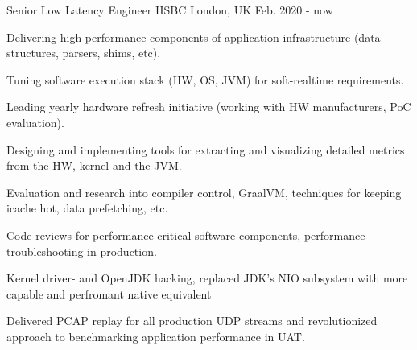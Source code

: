 

\begin{cventries}

  \cventry
    {Senior Low Latency Engineer} %
    {HSBC} %
    {London, UK} %
    {Feb. 2020 - now} %
    {
      \begin{cvitems} %
        \item {Delivering high-performance components of application infrastructure (data structures, parsers, shims, etc).}
        \item {Tuning software execution stack (HW, OS, JVM) for soft-realtime requirements.}
        \item {Leading yearly hardware refresh initiative (working with HW manufacturers, PoC evaluation).}
        \item {Designing and implementing tools for extracting and visualizing detailed metrics from the HW, kernel and the JVM.}
        \item {Evaluation and research into compiler control, GraalVM, techniques for keeping icache hot, data prefetching, etc.}
        \item {Code reviews for performance-critical software components, performance troubleshooting in production.}
        \item {Kernel driver- and OpenJDK hacking, replaced JDK's NIO subsystem with more capable and perfromant native equivalent}
        \item {Delivered PCAP replay for all production UDP streams and revolutionized approach to benchmarking application performance in UAT.}
      \end{cvitems}
    }


\end{cventries}
